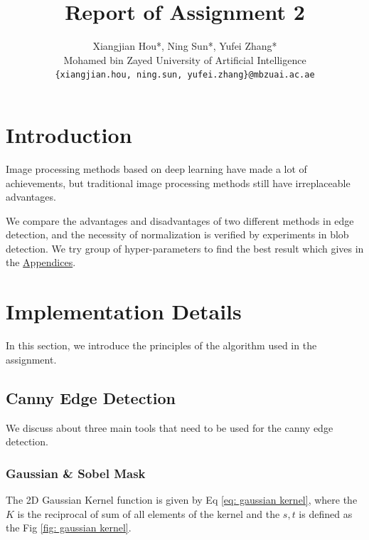 \documentclass[final]{cvpr}
\begin{document}
\title{Report of Assignment 2}

\author{Xiangjian Hou*, Ning Sun*, Yufei Zhang*\\
Mohamed bin Zayed University of Artificial Intelligence\\
{\tt\small \{xiangjian.hou, ning.sun, yufei.zhang\}@mbzuai.ac.ae}
}

\maketitle



\section{Introduction}
Image processing methods based on deep learning have made a lot of achievements, but traditional image processing methods still have irreplaceable advantages.

We compare the advantages and disadvantages of two different methods in edge detection, and the necessity of normalization is verified by experiments in blob detection. We try group of hyper-parameters to find the best result which gives in the \hyperref[append]{Appendices}.


\section{Implementation Details}

In this section, we introduce the principles of the algorithm used in the assignment.
\subsection{Canny Edge Detection}
We discuss about three main tools that need to be used for the canny edge detection.


\subsubsection{Gaussian \& Sobel Mask}

The 2D Gaussian Kernel function is given by Eq \eqref{eq: gaussian kernel}, where the $K$ is the reciprocal of sum of all elements of the kernel and the $s,t$ is defined as the Fig \ref{fig: gaussian kernel}.
\end{document}
